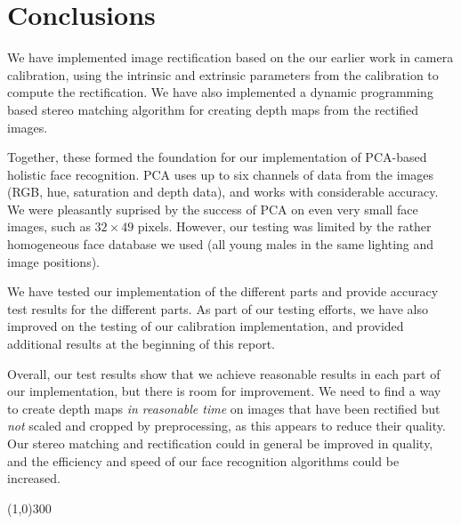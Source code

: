 
\section{Conclusions}
\label{sec:conclusions}
We have implemented image rectification based on the our earlier work
in camera calibration, using the intrinsic and extrinsic parameters from the
calibration to compute the rectification. We have also implemented a
dynamic programming based stereo matching algorithm for creating depth maps from
the rectified images.

Together, these formed the foundation for our implementation of PCA-based
holistic face recognition. PCA uses up to six channels of data from the images
(RGB, hue, saturation and depth data), and works with considerable accuracy. We
were pleasantly suprised by the success of PCA on even very small face images,
such as $32\times49$ pixels. However, our testing was limited by the rather
homogeneous face database we used (all young males in the same lighting and
image positions).

We have tested our implementation of the different parts and provide accuracy
test results for the different parts. As part of our testing efforts, we have
also improved on the testing of our calibration implementation, and provided
additional results at the beginning of this report.

Overall, our test results show that we achieve reasonable results in each part
of our implementation, but there is room for improvement. We need to find a way
to create depth maps \emph{in reasonable time} on images that have been
rectified but \emph{not} scaled and cropped by preprocessing, as this appears to
reduce their quality. Our stereo matching and rectification could in general be
improved in quality, and the efficiency and speed of our face recognition
algorithms could be increased.

\begin{center}
\line(1,0){300}

\end{center}
